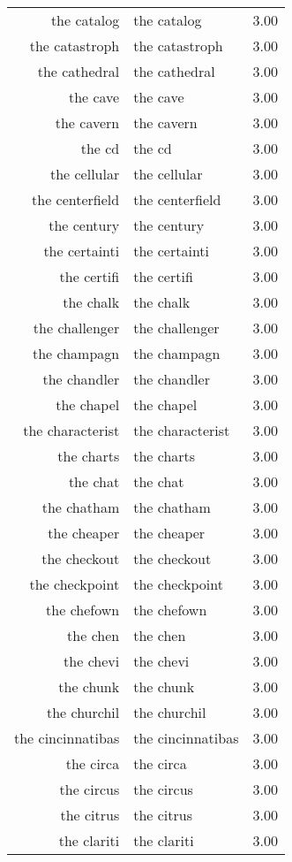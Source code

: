 \begin{table}[ht]
\begin{tabular}{rlr}
  the catalog & the catalog & 3.00 \\ 
  the catastroph & the catastroph & 3.00 \\ 
  the cathedral & the cathedral & 3.00 \\ 
  the cave & the cave & 3.00 \\ 
  the cavern & the cavern & 3.00 \\ 
  the cd & the cd & 3.00 \\ 
  the cellular & the cellular & 3.00 \\ 
  the centerfield & the centerfield & 3.00 \\ 
  the century & the century & 3.00 \\ 
  the certainti & the certainti & 3.00 \\ 
  the certifi & the certifi & 3.00 \\ 
  the chalk & the chalk & 3.00 \\ 
  the challenger & the challenger & 3.00 \\ 
  the champagn & the champagn & 3.00 \\ 
  the chandler & the chandler & 3.00 \\ 
  the chapel & the chapel & 3.00 \\ 
  the characterist & the characterist & 3.00 \\ 
  the charts & the charts & 3.00 \\ 
  the chat & the chat & 3.00 \\ 
  the chatham & the chatham & 3.00 \\ 
  the cheaper & the cheaper & 3.00 \\ 
  the checkout & the checkout & 3.00 \\ 
  the checkpoint & the checkpoint & 3.00 \\ 
  the chefown & the chefown & 3.00 \\ 
  the chen & the chen & 3.00 \\ 
  the chevi & the chevi & 3.00 \\ 
  the chunk & the chunk & 3.00 \\ 
  the churchil & the churchil & 3.00 \\ 
  the cincinnatibas & the cincinnatibas & 3.00 \\ 
  the circa & the circa & 3.00 \\ 
  the circus & the circus & 3.00 \\ 
  the citrus & the citrus & 3.00 \\ 
  the clariti & the clariti & 3.00 \\ 

\end{tabular}
\end{table}

